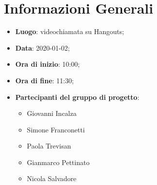 \section{Informazioni Generali}
	\begin{itemize}
		\item \textbf {Luogo}: videochiamata su Hangouts;
		\item \textbf {Data}: 2020-01-02;
		\item \textbf {Ora di inizio}: 10:00;
		\item \textbf {Ora di fine}: 11:30;
		\item \textbf {Partecipanti del gruppo di progetto}:
			\begin{itemize}
				\item Giovanni Incalza
				\item Simone Franconetti
				\item Paola Trevisan
				\item Gianmarco Pettinato
				\item Nicola Salvadore
			\end{itemize}
	\end{itemize}